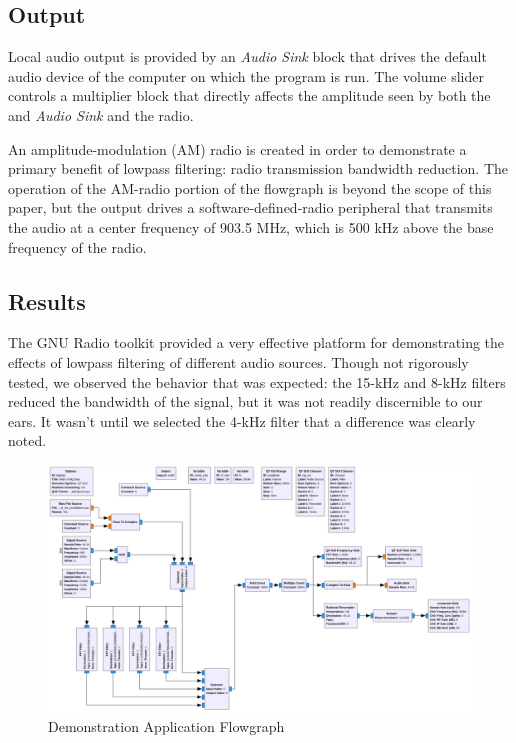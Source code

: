 \subsection{Output}

Local audio output is provided by an \textit{Audio Sink} block
that drives the default audio device of the computer on which the
program is run. The volume slider controls a multiplier block
that directly affects the amplitude seen by both the and \textit{Audio
Sink} and the radio.

An amplitude-modulation (AM) radio is created in order to
demonstrate a primary benefit of lowpass filtering: radio
transmission bandwidth reduction. The operation of the AM-radio
portion of the flowgraph is beyond the scope of this paper, but
the output drives a software-defined-radio peripheral that
transmits the audio at a center frequency of 903.5 MHz, which is
500 kHz above the base frequency of the radio.

\subsection{Results}

The GNU Radio toolkit provided a very effective platform for
demonstrating the effects of lowpass filtering of different audio
sources. Though not rigorously tested, we observed the behavior
that was expected: the 15-kHz and 8-kHz filters reduced the
bandwidth of the signal, but it was not readily discernible to
our ears. It wasn't until we selected the 4-kHz filter that a
difference was clearly noted.

\begin{figure}
	\centering
	\includegraphics[width=\textwidth]{images/player_grc.png} 
	\caption{Demonstration Application Flowgraph}
	\label{fig:flowgraph}
\end{figure}    

